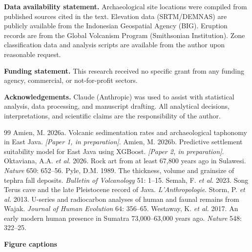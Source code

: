 \documentclass[12pt]{article}
\begin{document}
\textbf{Data availability statement.}
Archaeological site locations were compiled from published sources cited in the text. Elevation data (SRTM/DEMNAS) are publicly available from the Indonesian Geospatial Agency (BIG). Eruption records are from the Global Volcanism Program (Smithsonian Institution). Zone classification data and analysis scripts are available from the author upon reasonable request.

\textbf{Funding statement.}
This research received no specific grant from any funding agency, commercial, or not-for-profit sectors.

\textbf{Acknowledgements.}
Claude (Anthropic) was used to assist with statistical analysis, data processing, and manuscript drafting. All analytical decisions, interpretations, and scientific claims are the responsibility of the author.

\begin{thebibliography}{99}
 Amien, M. 2026a. Volcanic sedimentation rates and archaeological taphonomy in East Java. \textit{[Paper 1, in preparation]}.
 Amien, M. 2026b. Predictive settlement suitability model for East Java using XGBoost. \textit{[Paper 2, in preparation]}.
 Oktaviana, A.A. \textit{et al.} 2026. Rock art from at least 67,800 years ago in Sulawesi. \textit{Nature} 650: 652--56.
 Pyle, D.M. 1989. The thickness, volume and grainsize of tephra fall deposits. \textit{Bulletin of Volcanology} 51: 1--15.
 Semah, F. \textit{et al.} 2023. Song Terus cave and the late Pleistocene record of Java. \textit{L'Anthropologie}.
 Storm, P. \textit{et al.} 2013. U-series and radiocarbon analyses of human and faunal remains from Wajak. \textit{Journal of Human Evolution} 64: 356--65.
 Westaway, K. \textit{et al.} 2017. An early modern human presence in Sumatra 73,000--63,000 years ago. \textit{Nature} 548: 322--25.
\end{thebibliography}


\clearpage
\textbf{Figure captions}
\end{document}
